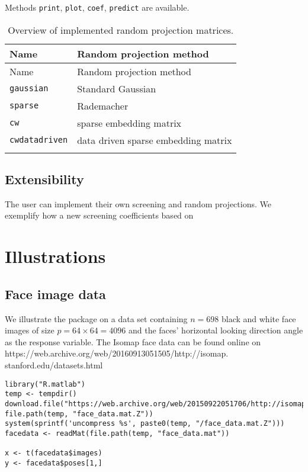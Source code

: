 \documentclass[
  article]{jss}
\begin{document}
Methods \texttt{print}, \texttt{plot}, \texttt{coef}, \texttt{predict}
are available.

\begin{longtable}[]{@{}ll@{}}
\toprule\noalign{}
Name & Random projection method \\
\midrule\noalign{}
\endfirsthead
\toprule\noalign{}
Name & Random projection method \\
\midrule\noalign{}
\endhead
\bottomrule\noalign{}
\endlastfoot
\texttt{gaussian} & Standard Gaussian \\
\texttt{sparse} & Rademacher \\
\texttt{cw} & sparse embedding matrix \\
\texttt{cwdatadriven} & data driven sparse embedding matrix \\
\caption{Overview of implemented random projection
matrices.}\label{tbl-overviewrp}\tabularnewline
\end{longtable}

\subsection{Extensibility}\label{extensibility}

The user can implement their own screening and random projections. We
exemplify how a new screening coefficients based on

\section{Illustrations}\label{sec-illustrations}

\subsection{Face image data}\label{face-image-data}

We illustrate the package on a data set containing \(n = 698\) black and
white face images of size \(p = 64 \times 64 = 4096\) and the faces'
horizontal looking direction angle as the response variable. The Isomap
face data can be found online on
https://web.archive.org/web/20160913051505/http://isomap.
stanford.edu/datasets.html

\begin{verbatim}
library("R.matlab")
temp <- tempdir()
download.file("https://web.archive.org/web/20150922051706/http://isomap.stanford.edu/face_data.mat.Z", file.path(temp, "face_data.mat.Z"))
system(sprintf('uncompress %s', paste0(temp, "/face_data.mat.Z")))
facedata <- readMat(file.path(temp, "face_data.mat"))

x <- t(facedata$images)
y <- facedata$poses[1,]
\end{verbatim}
\end{document}
